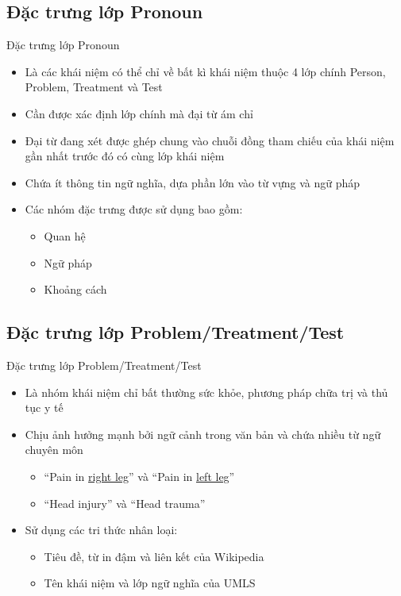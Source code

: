 \subsection*{Đặc trưng lớp Pronoun}
\begin{frame}{Đặc trưng lớp Pronoun}
\putlogo
\begin{itemize}
	\item Là các khái niệm có thể chỉ về bất kì khái niệm thuộc 4 lớp chính Person, Problem, Treatment và Test
	\item Cần được {\color{red} xác định lớp chính} mà đại từ ám chỉ
	\item Đại từ đang xét được ghép chung vào chuỗi đồng tham chiếu của khái niệm gần nhất trước đó có cùng lớp khái niệm
	\item Chứa ít thông tin ngữ nghĩa, dựa phần lớn vào từ vựng và ngữ pháp
	\item Các nhóm đặc trưng được sử dụng bao gồm:
	\begin{itemize}
		\item Quan hệ
		\item Ngữ pháp
		\item Khoảng cách
	\end{itemize}
\end{itemize}
\end{frame}

\subsection*{Đặc trưng lớp Problem/Treatment/Test}
\begin{frame}{Đặc trưng lớp Problem/Treatment/Test}
\putlogo
\begin{itemize}
	\item Là nhóm khái niệm chỉ bất thường sức khỏe, phương pháp chữa trị và thủ tục y tế
	\item Chịu ảnh hưởng mạnh bởi {\color{red} ngữ cảnh trong văn bản} và chứa nhiều {\color{red} từ ngữ chuyên môn}
	\begin{itemize}
		\item ``Pain in \underline{right leg}'' và ``Pain in \underline{left leg}''
		\item ``Head injury'' và ``Head trauma''
	\end{itemize}
	\item Sử dụng các tri thức nhân loại:
	\begin{itemize}
		\item Tiêu đề, từ in đậm và liên kết của {\color{red} Wikipedia}
		\item Tên khái niệm và lớp ngữ nghĩa của {\color{red} UMLS}
	\end{itemize}
\end{itemize}
\end{frame}

